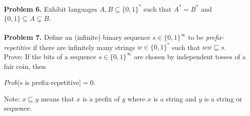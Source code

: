 \documentclass[11pt]{article}
\begin{document}
\vspace{0.75cm}

{\bf Problem 6.} Exhibit languages $A,B \subseteq \{0,1\}^*$ such that $A^* = B^*$ and $\{0,1\} \subseteq A \subsetneq B$.\\\\

{\bf Problem 7.} Define an (infinite) binary sequence $s \in \{0,1\}^{\infty}$ to be \emph{prefix-repetitive} if there are infinitely many strings $w \in \{0,1\}^*$ such that $ww \sqsubseteq s$.\\

Prove: If the bits of a sequence $s \in \{0,1\}^{\infty}$ are chosen by independent tosses of a fair coin, then
\begin{center}
$Prob[s$ is prefix-repetitive$] = 0$.
\end{center}
Note: $x \sqsubseteq y$ means that $x$ is a prefix of $y$ where $x$ is a string and $y$ is a string or sequence.\\
\end{document}

